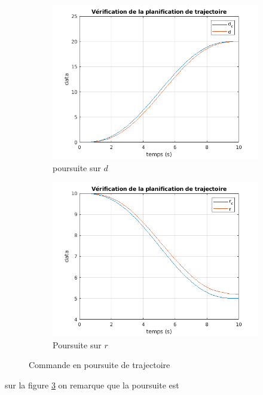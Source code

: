 \documentclass[10pt,a4paper,notitlepage]{article}
\begin{document}
\begin{figure}[H]
  \centering
  \begin{subfigure}{0.5\textwidth}
    \centering
    \includegraphics[width=\linewidth]{traj_plan_d}
    \caption{poursuite sur $d$}
    \label{fig:label}
  \end{subfigure}%
\begin{subfigure}{0.5\textwidth}
  \centering
  \includegraphics[width=\linewidth]{traj_plan_r}
  \caption{Poursuite sur $r$}
  \label{fig:label}
\end{subfigure}
\caption{Commande en poursuite de trajectoire}
\label{fig:pours_traj}
\end{figure}
sur la figure \ref{fig:pours_traj} on remarque que la poursuite est
\end{document}
